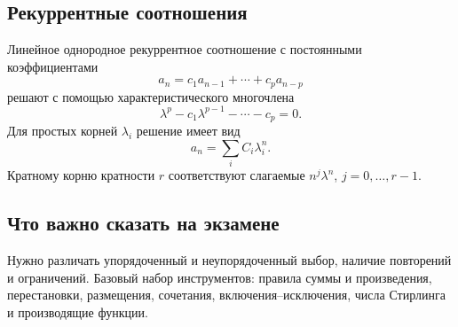 \subsection{Рекуррентные соотношения}

Линейное однородное рекуррентное соотношение с постоянными коэффициентами
\[
    a_n=c_1a_{n-1}+\cdots+c_pa_{n-p}
\]
решают с помощью характеристического многочлена
\[
    \lambda^p-c_1\lambda^{p-1}-\cdots-c_p=0.
\]
Для простых корней $\lambda_i$ решение имеет вид
\[
    a_n=\sum_i C_i\lambda_i^n.
\]
Кратному корню кратности $r$ соответствуют слагаемые
$n^j\lambda^n$, $j=0,\ldots,r-1$.

\subsection{Что важно сказать на экзамене}

Нужно различать упорядоченный и неупорядоченный выбор, наличие повторений и
ограничений. Базовый набор инструментов: правила суммы и произведения,
перестановки, размещения, сочетания, включения--исключения, числа Стирлинга и
производящие функции.

\newpage